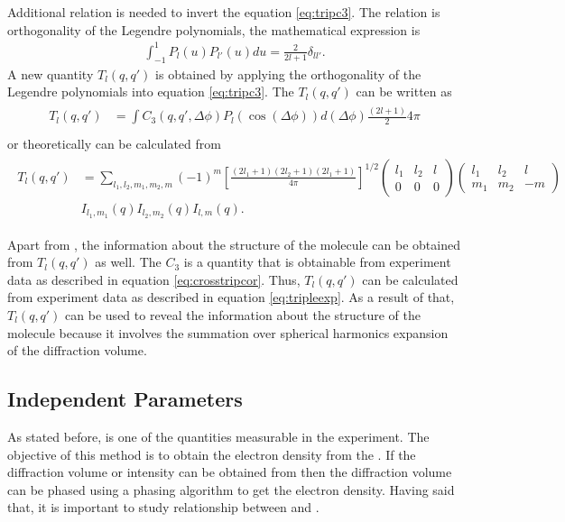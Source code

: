 Additional relation is needed to invert the equation \ref{eq:tripc3}. The relation is orthogonality of the Legendre polynomials, the mathematical expression is
\begin{eqnarray}
\int_{-1}^{1} P_{l}(u) P_{l'}(u) du =\frac{2}{2l+1} \delta_{ll'}. 
\end{eqnarray}
A new quantity $T_{l}(q,q')$ is obtained by applying the orthogonality of the Legendre polynomials into equation \ref{eq:tripc3}. The $T_{l}(q,q')$ can be written as
\begin{align}
\begin{split}
T_{l}(q,q')&=\int C_{3}(q,q',\Delta \phi)  P_{l}(\cos(\Delta \phi)) d(\Delta \phi) \frac{(2 l+1)}{2} 4 \pi \\ 
\label{eq:tripleexp}
\end{split}
\end{align}
or theoretically can be calculated from
\begin{align}
\begin{split}
T_{l}(q,q')&= \sum_{l_1,l_2,m_1,m_2,m} (-1)^m
 \left[\frac{(2l_1+1)(2l_2+1)(2l_1+1)}{4 \pi}\right]^{1/2}
 \left( \begin{array}{ccc}
l_1 & l_2 & l \\
0 & 0 & 0  \end{array} \right) 
 \left( \begin{array}{ccc}
l_1 & l_2 & l \\
m_1 & m_2 & -m  \end{array} \right)  \\ 
&  I_{l_1,m_1}(q) I_{l_2,m_2}(q) I_{l,m}(q).       
\label{eq:triple}
\end{split}
\end{align}

Apart from \Blq, the information about the structure of the molecule can be obtained from $T_{l}(q,q')$ as well. The $C_{3}$ is a quantity that is obtainable from experiment data as described in equation \ref{eq:crosstripcor}. Thus, $T_{l}(q,q')$ can be calculated from experiment data as described in equation \ref{eq:tripleexp}. As a result of that, $T_{l}(q,q')$ can be used to reveal the information about the structure of the molecule because it involves the summation over spherical harmonics expansion of the diffraction volume.
\subsection{Independent Parameters}
As stated before, \Blq is one of the quantities measurable in the experiment. The objective of this method is to obtain the electron density from the \Blq. If the diffraction volume or intensity can be obtained from \Blq then the diffraction volume can be phased using a phasing algorithm to get the electron density. Having said that, it is important to study relationship between \Blq and \Ilm. 

